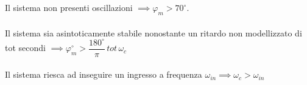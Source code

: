 \documentclass[a4paper]{article}
\begin{document}
	\\\\Il sistema non presenti oscillazioni $ \implies \varphi_m>70^{\circ} $.
	\\\\Il sistema sia asintoticamente stabile nonostante un ritardo non modellizzato di tot secondi $ \implies \varphi_m^{\circ}>\dfrac{180^{\circ}}{\pi}\,tot\,\omega_c$
	\\\\Il sistema riesca ad inseguire un ingresso a frequenza $\omega_{in}\implies\omega_c>\omega_{in}$
	

	\newpage
	\appendix
	
\end{document}
